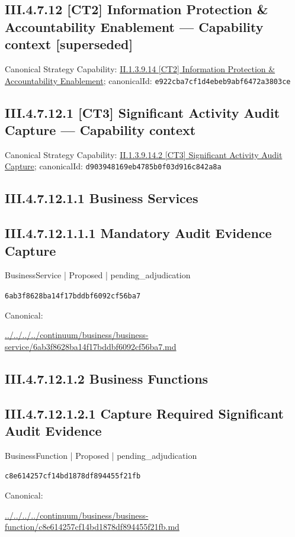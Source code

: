 \documentclass[10pt,a4paper]{article}
\begin{document}
\subsection*{III.4.7.12 [CT2] Information Protection \& Accountability Enablement — Capability context [superseded]}
Canonical Strategy Capability: \hyperref[element-e922cba7cf1d4ebeb9abf6472a3803ce]{II.1.3.9.14 [CT2] Information Protection \& Accountability Enablement}; canonicalId: \texttt{e922cba7cf1d4ebeb9abf6472a3803ce}\par
\subsection*{III.4.7.12.1 [CT3] Significant Activity Audit Capture — Capability context}
Canonical Strategy Capability: \hyperref[element-d903948169eb4785b0f03d916c842a8a]{II.1.3.9.14.2 [CT3] Significant Activity Audit Capture}; canonicalId: \texttt{d903948169eb4785b0f03d916c842a8a}\par
\subsection*{III.4.7.12.1.1 Business Services}
\subsection*{III.4.7.12.1.1.1 Mandatory Audit Evidence Capture}
\label{element-6ab3f8628ba14f17bddbf6092cf56ba7}
{\small BusinessService | Proposed | pending\_adjudication}\par
\texttt{6ab3f8628ba14f17bddbf6092cf56ba7}\par
Canonical: \par
{\footnotesize\url{../../../../continuum/business/business-service/6ab3f8628ba14f17bddbf6092cf56ba7.md}}\par
\subsection*{III.4.7.12.1.2 Business Functions}
\subsection*{III.4.7.12.1.2.1 Capture Required Significant Audit Evidence}
\label{element-c8e614257cf14bd1878df894455f21fb}
{\small BusinessFunction | Proposed | pending\_adjudication}\par
\texttt{c8e614257cf14bd1878df894455f21fb}\par
Canonical: \par
{\footnotesize\url{../../../../continuum/business/business-function/c8e614257cf14bd1878df894455f21fb.md}}\par
\end{document}
